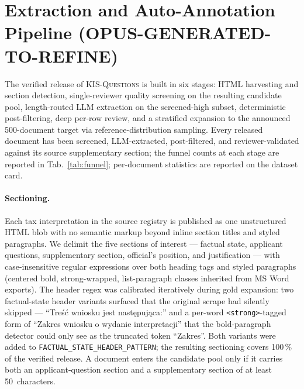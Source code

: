 
\section{Extraction and Auto-Annotation Pipeline (OPUS-GENERATED-TO-REFINE)}
\label{app:extraction}

The verified release of \textsc{KIS-Questions} is built in six
stages: HTML harvesting and section detection, single-reviewer
quality screening on the resulting candidate pool, length-routed LLM
extraction on the screened-high subset, deterministic post-filtering,
deep per-row review, and a stratified expansion to the announced
500-document target via reference-distribution sampling. Every
released document has been screened, LLM-extracted, post-filtered, and
reviewer-validated against its source supplementary section; the
funnel counts at each stage are reported in
Tab.~\ref{tab:funnel}; per-document statistics are reported on the
dataset card.

\paragraph{Sectioning.}
Each tax interpretation in the source registry is published as one
unstructured HTML blob with no semantic markup beyond inline section
titles and styled paragraphs. We delimit the five sections of interest
--- factual state, applicant questions, supplementary section,
official's position, and justification --- with case-insensitive
regular expressions over both heading tags and styled paragraphs
(centered bold, strong-wrapped, list-paragraph classes inherited from
MS Word exports). The header regex was calibrated iteratively during
gold expansion: two factual-state header variants surfaced that the
original scrape had silently skipped --- ``Treść wniosku jest
następująca:'' and a per-word \texttt{<strong>}-tagged form of
``Zakres wniosku o wydanie interpretacji'' that the bold-paragraph
detector could only see as the truncated token ``Zakres''.
Both variants were added to \texttt{FACTUAL\_STATE\_HEADER\_PATTERN};
the resulting sectioning covers 100\,\% of the verified release.
A document enters the candidate pool only if it carries both an
applicant-question section and a supplementary section of at least
50~characters.

